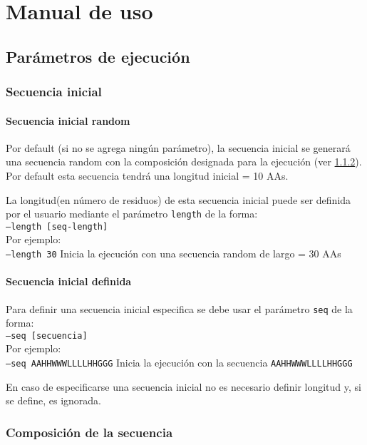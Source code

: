 \chapter{Manual de uso}\label{manual}

\section{Parámetros de ejecución}\label{parametros}
\subsection{Secuencia inicial} \label{secuenciaInicial}
\subsubsection{Secuencia inicial random}\label{secuenciaInicialRandom}
Por default (si no se agrega ningún parámetro), la secuencia inicial se generará una secuencia random con la composición designada para la ejecución (ver \ref{composicion}).\\
Por default esta secuencia tendrá una longitud inicial = 10 AAs.

La longitud(en número de residuos) de esta secuencia inicial puede ser definida por el usuario mediante el parámetro \texttt{length} de la forma: \\
\indent \texttt{--length [seq-length]}
\\Por ejemplo: \\
\indent \texttt{--length 30} \hspace{0.5cm} Inicia la ejecución con una secuencia random de largo = 30 AAs


\subsubsection{Secuencia inicial definida}\label{secuenciaInicialDefinida}
Para definir una secuencia inicial especifica se debe usar el parámetro \texttt{seq} de la forma: \\
\indent \texttt{--seq [secuencia]} 
\\Por ejemplo: \\
\indent \texttt{--seq AAHHWWWLLLLHHGGG} \hspace{0.5cm} Inicia la ejecución con la secuencia \texttt{AAHHWWWLLLLHHGGG}

En caso de especificarse una secuencia inicial no es necesario definir longitud y, si se define, es ignorada.

\subsection{Composición de la secuencia} \label{composicion}




